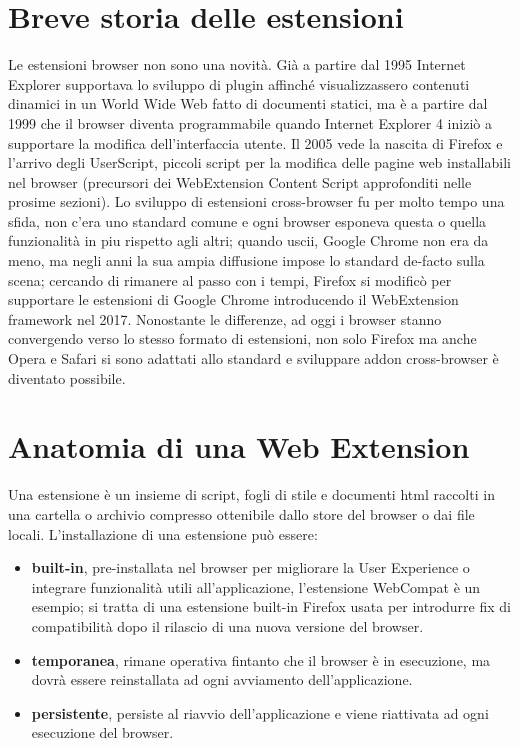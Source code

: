 \documentclass{sapthesis}
\newcommand{\bold}[1]{\textbf{#1}}
\begin{document}
    \section{Breve storia delle estensioni}
    \label{breve_storia_delle_estensioni}
        Le estensioni browser non sono una novità. Già a partire dal 1995 Internet Explorer
        supportava lo sviluppo di plugin \cite{extension-history} affinché visualizzassero contenuti
        dinamici in un World Wide Web fatto di documenti statici, ma è a partire dal 1999 che
        il browser diventa programmabile quando Internet Explorer 4 iniziò a supportare la modifica
        dell'interfaccia utente. Il 2005 vede la nascita di Firefox e l'arrivo degli UserScript,
        piccoli script per la modifica delle pagine web installabili nel browser (precursori dei
        WebExtension Content Script approfonditi nelle prosime sezioni).
        Lo sviluppo di estensioni cross-browser fu per molto tempo una sfida, non c'era uno standard
        comune e ogni browser esponeva questa o quella funzionalità in piu rispetto agli altri; quando
        uscii, Google Chrome non era da meno, ma negli anni la sua ampia diffusione impose lo standard
        de-facto sulla scena; cercando di rimanere al passo con i tempi, Firefox si modificò per
        supportare le estensioni di Google Chrome introducendo il WebExtension framework nel 2017.
        Nonostante le differenze, ad oggi i browser stanno convergendo verso lo stesso formato di estensioni,
        non solo Firefox ma anche Opera e Safari si sono adattati allo standard e sviluppare addon
        cross-browser è diventato possibile.

    \section{Anatomia di una Web Extension }
    \label{anatomia_di_una_web_extension}
        Una estensione è un insieme di script, fogli di stile e documenti html raccolti in una cartella o
        archivio compresso ottenibile dallo store del browser o dai file locali. L'installazione di una
        estensione può essere:
        \begin{itemize}
            \item \bold{built-in}, pre-installata nel browser per migliorare la User Experience
                    o integrare funzionalità utili all'applicazione, l'estensione WebCompat è un esempio;
                    si tratta di una estensione built-in Firefox usata per introdurre fix di compatibilità
                    dopo il rilascio di una nuova versione del browser.

            \item \bold{temporanea}, rimane operativa fintanto che il browser è in esecuzione, ma dovrà essere
                    reinstallata ad ogni avviamento dell'applicazione.

            \item \bold{persistente}, persiste al riavvio dell'applicazione e viene riattivata ad ogni
                    esecuzione del browser.
        \end{itemize}
        
\end{document}
